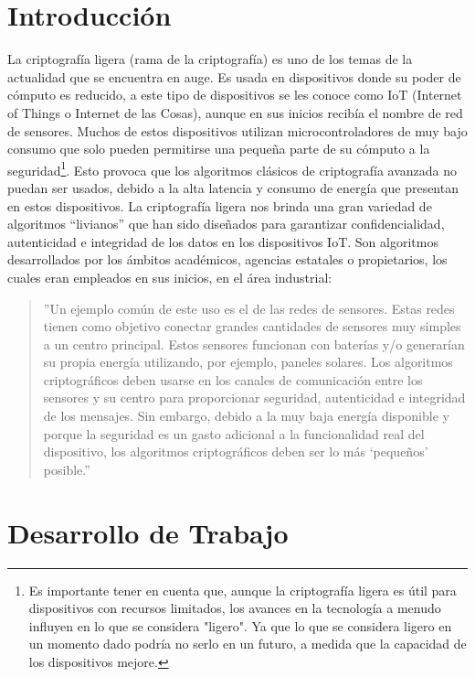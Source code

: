 \documentclass[a4paper,10pt]{article}
\begin{document}
	\section{Introducción}
	La criptografía ligera (rama de la criptografía) es uno de los temas de la actualidad que se encuentra en auge. Es usada en dispositivos donde su poder de cómputo es reducido, a este tipo de dispositivos se les conoce como IoT (Internet of Things o Internet de las Cosas), aunque en sus inicios recibía el nombre de red de sensores. Muchos de estos dispositivos utilizan microcontroladores de muy bajo consumo que solo pueden permitirse una pequeña parte de su cómputo a la seguridad\footnote{Es importante tener en cuenta que, aunque la criptografía ligera es útil para dispositivos con recursos limitados, los avances en la tecnología a menudo influyen en lo que se considera "ligero". Ya que lo que se considera ligero en un momento dado podría no serlo en un futuro, a medida que la capacidad de los dispositivos mejore.}. Esto provoca que los algoritmos clásicos de criptografía avanzada no puedan ser usados, debido a la alta latencia y consumo de energía que presentan en estos dispositivos. La criptografía ligera nos brinda una gran variedad de algoritmos “livianos” que han sido diseñados para garantizar confidencialidad, autenticidad e integridad de los datos en los dispositivos IoT. Son algoritmos desarrollados por los ámbitos académicos, agencias estatales o propietarios, los cuales eran empleados en sus inicios, en el área industrial:
	\begin{quote}
		''Un ejemplo común de este uso es el de las redes de sensores. Estas redes tienen como objetivo conectar grandes cantidades de sensores muy simples a un centro principal. Estos sensores funcionan con baterías y/o generarían su propia energía utilizando, por ejemplo, paneles solares. Los algoritmos criptográficos deben usarse en los canales de comunicación entre los sensores y su centro para proporcionar seguridad, autenticidad e integridad de los mensajes. Sin embargo, debido a la muy baja energía disponible y porque la seguridad es un gasto adicional a la funcionalidad real del dispositivo, los algoritmos criptográficos deben ser lo más ‘pequeños’ posible.'' \parencite[1]{biryukov2017state}
	\end{quote}
	\section{Desarrollo de Trabajo}
\end{document}
